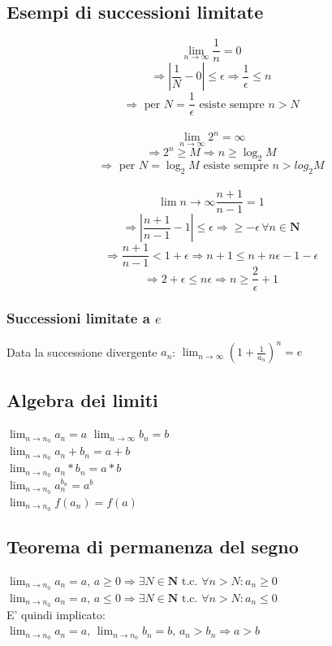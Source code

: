 \documentclass{report}
\begin{document}
    \subsection{Esempi di successioni limitate}
        $$\lim_{n \to \infty} \frac{1}{n} = 0$$ 
        $$\Longrightarrow |\frac{1}{N}-0| \leq \epsilon \Longrightarrow \frac{1}{\epsilon} \leq n$$
        $$\Longrightarrow \textrm{ per } N = \frac{1}{\epsilon} \textrm{ esiste sempre } n > N$$
        \\
        $$\lim_{n \to \infty} 2^n = \infty$$
        $$\Longrightarrow 2^n \geq M \Longrightarrow n \geq \log_2M$$
        $$\Longrightarrow \textrm{ per } N = \log_2M \textrm{ esiste sempre } n > log_2M$$ 
        \\
        $$\lim{n \to \infty} \frac{n+1}{n-1} = 1$$
        $$\Longrightarrow |\frac{n+1}{n-1} - 1| \leq \epsilon \Longrightarrow \geq -\epsilon \, \forall n \in \mathbf{N}$$
        $$\Longrightarrow \frac{n+1}{n-1} < 1 + \epsilon \Longrightarrow n+1 \leq n + n\epsilon -1 - \epsilon$$
        $$\Longrightarrow 2 + \epsilon \leq n\epsilon \Longrightarrow n \geq \frac{2}{\epsilon} + 1$$
        \subsubsection{Successioni limitate a $e$}
            Data la successione divergente $a_n$: $\lim_{n \to \infty} \left(1+\frac{1}{a_n}\right)^n = e$
    \subsection{Algebra dei limiti}
        $\lim_{n \to n_0} a_n = a \, \, \lim_{n \to \infty} b_n = b$ \\
        $\lim_{n \to n_0} a_n + b_n = a + b$ \\
        $\lim_{n \to n_0} a_n * b_n = a * b$ \\
        $\lim_{n \to n_0} a_n^{b_n} = a^b$ \\
        $\lim_{n \to n_0} f(a_n) = f(a)$ \\
    \subsection{Teorema di permanenza del segno}
        $\lim_{n \to n_0} a_n = a, \, a \geq 0 \Longrightarrow \exists N \in \mathbf{N} \textrm{ t.c. }
            \forall n > N: a_n \geq 0$ \\
        $\lim_{n \to n_0} a_n = a, \, a \leq 0 \Longrightarrow \exists N \in \mathbf{N} \textrm{ t.c. }
            \forall n > N: a_n \leq 0$ \\
        E' quindi implicato: \\
        $\lim_{n \to n_0} a_n = a, \, \lim_{n \to n_0} b_n = b, \, a_n > b_n \Longrightarrow a > b$
\end{document}
